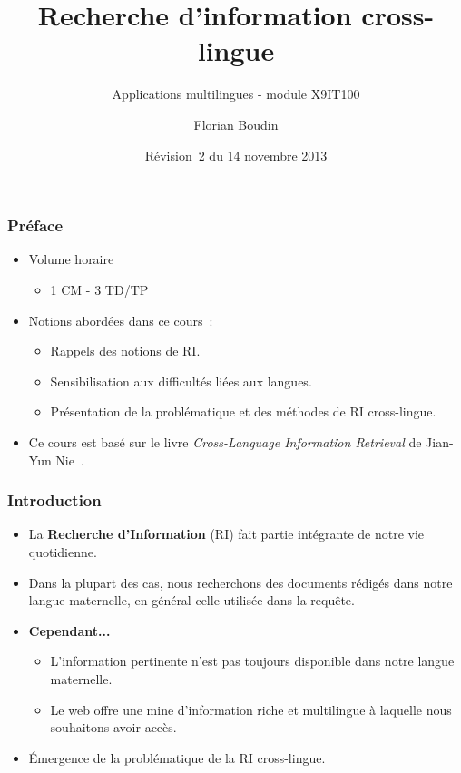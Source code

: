\documentclass[12pt,aspectratio=43,dvipsnames,table]{beamer}
\title{Recherche d'information cross-lingue}
\subtitle{Applications multilingues - module X9IT100}
\author{Florian Boudin}
\institute{Département informatique, Université de Nantes}
\date[14 novembre 2013 / Rév.~2]{Révision~2 du 14 novembre 2013}
\begin{document}
\frame[plain]{\titlepage}


\begin{frame}
    \frametitle{Préface}
    \begin{itemize} \itemsep10pt
        \item Volume horaire
        \begin{itemize}
            \item 1 CM - 3 TD/TP
        \end{itemize}
        \item Notions abordées dans ce cours~:
        \begin{itemize}
            \item Rappels des notions de RI.
            \item Sensibilisation aux difficultés liées aux langues.
            \item Présentation de la problématique et des méthodes de RI 
                  cross-lingue.
        \end{itemize}
        \item Ce cours est basé sur le livre \textit{Cross-Language Information 
              Retrieval} de Jian-Yun Nie~\cite{DBLP:series/synthesis/2010Nie}.
    \end{itemize}
\end{frame}


\begin{frame}
    \frametitle{Introduction}
    \begin{itemize} \itemsep10pt
        \item La \textbf{Recherche d'Information} (RI) fait partie intégrante de
              notre vie quotidienne.
        \item Dans la plupart des cas, nous recherchons des documents rédigés 
              dans notre langue maternelle, en général celle utilisée dans la 
              requête.
        \item \textbf{Cependant...}
        \begin{itemize}
            \item L'information pertinente n'est pas toujours disponible dans 
                  notre langue maternelle.
            \item Le web offre une mine d'information riche et multilingue à 
                  laquelle nous souhaitons avoir accès.
        \end{itemize}
        \item \'Emergence de la problématique de la RI cross-lingue.
    \end{itemize}
\end{frame}
\end{document}
